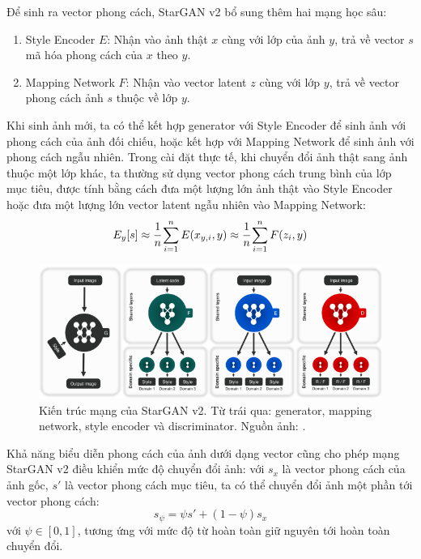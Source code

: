 \documentclass[12pt]{extreport}
\begin{document}
Để sinh ra vector phong cách, StarGAN v2 bổ sung thêm hai mạng học sâu:
\begin{enumerate}
    \item Style Encoder $ E $: Nhận vào ảnh thật $ x $ cùng với lớp của ảnh $ y $, trả về vector $ s $ mã hóa phong cách của $ x $ theo $ y $.
    \item Mapping Network $ F $: Nhận vào vector latent $ z $ cùng với lớp $ y $, trả về vector phong cách ảnh $ s $ thuộc về lớp $ y $.
\end{enumerate}
Khi sinh ảnh mới, ta có thể kết hợp generator với Style Encoder để sinh ảnh với phong cách của ảnh đối chiếu, hoặc kết hợp với Mapping Network để sinh ảnh với phong cách ngẫu nhiên. Trong cài đặt thực tế, khi chuyển đổi ảnh thật sang ảnh thuộc một lớp khác, ta thường sử dụng vector phong cách trung bình của lớp mục tiêu, được tính bằng cách đưa một lượng lớn ảnh thật vào Style Encoder hoặc đưa một lượng lớn vector latent ngẫu nhiên vào Mapping Network:
$$ E_y[s] \approx \cfrac{1}{n} \sum_{i = 1}^{n} E(x_{y, i}, y) \approx \cfrac{1}{n} \sum_{i = 1}^{n} F(z_{i}, y) $$

\begin{figure}[H]
    \centering
    \includegraphics[width=\linewidth]{figure23.png}
    \caption{Kiến trúc mạng của StarGAN v2. Từ trái qua: generator, mapping network, style encoder và discriminator. Nguồn ảnh: \cite{choi2020stargan}.}
\end{figure}

Khả năng biểu diễn phong cách của ảnh dưới dạng vector cũng cho phép mạng StarGAN v2 điều khiển mức độ chuyển đổi ảnh: với $ s_{x} $ là vector phong cách của ảnh gốc, $ s' $ là vector phong cách mục tiêu, ta có thể chuyển đổi ảnh một phần tới vector phong cách:
$$ s_{\psi} = \psi s' + (1 - \psi) s_{x} $$
với $ \psi \in [0, 1] $, tương ứng với mức độ từ hoàn toàn giữ nguyên tới hoàn toàn chuyển đổi.
\end{document}

